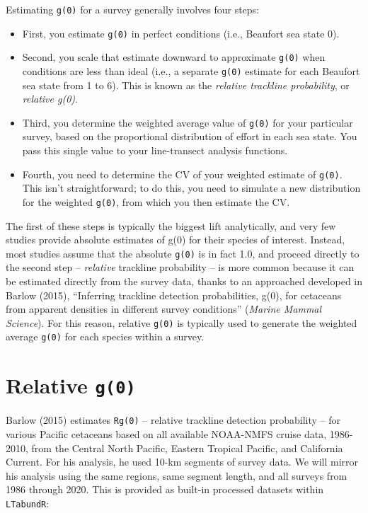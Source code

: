 \documentclass[
]{book}
\begin{document}
Estimating \texttt{g(0)} for a survey generally involves four steps:

\begin{itemize}
\item
  First, you estimate \texttt{g(0)} in perfect conditions (i.e., Beaufort sea state 0).
\item
  Second, you scale that estimate downward to approximate \texttt{g(0)} when conditions are less than ideal (i.e., a separate \texttt{g(0)} estimate for each Beaufort sea state from 1 to 6). This is known as the \emph{relative trackline probability}, or \emph{relative g(0)}.
\item
  Third, you determine the weighted average value of \texttt{g(0)} for your particular survey, based on the proportional distribution of effort in each sea state. You pass this single value to your line-transect analysis functions.
\item
  Fourth, you need to determine the CV of your weighted estimate of \texttt{g(0)}. This isn't straightforward; to do this, you need to simulate a new distribution for the weighted \texttt{g(0)}, from which you then estimate the CV.
\end{itemize}

The first of these steps is typically the biggest lift analytically, and very few studies provide absolute estimates of g(0) for their species of interest. Instead, most studies assume that the absolute \texttt{g(0)} is in fact 1.0, and proceed directly to the second step -- \emph{relative} trackline probability -- is more common because it can be estimated directly from the survey data, thanks to an approached developed in Barlow (2015), ``Inferring trackline detection probabilities, g(0), for cetaceans from apparent densities in different survey conditions'' (\emph{Marine Mammal Science}). For this reason, relative \texttt{g(0)} is typically used to generate the weighted average \texttt{g(0)} for each species within a survey.

\hypertarget{relative-g0}{%
\section*{\texorpdfstring{Relative \texttt{g(0)}}{Relative g(0)}}\label{relative-g0}}

Barlow (2015) estimates \texttt{Rg(0)} -- relative trackline detection probability -- for various Pacific cetaceans based on all available NOAA-NMFS cruise data, 1986-2010, from the Central North Pacific, Eastern Tropical Pacific, and California Current. For his analysis, he used 10-km segments of survey data. We will mirror his analysis using the same regions, same segment length, and all surveys from 1986 through 2020. This is provided as built-in processed datasets within \texttt{LTabundR}:
\end{document}
